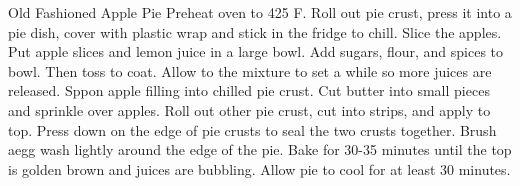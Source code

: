 \documentclass[../main.tex]{subfiles}
\begin{document}
\begin{recipe}{Old Fashioned Apple Pie}{}{}
    Preheat oven to 425 \degrees{}F.
    Roll out pie crust, press it into a pie dish, cover with plastic wrap and
    stick in the fridge to chill.
    Slice the apples.
    Put apple slices and lemon juice in a large bowl.
    Add sugars, flour, and spices to bowl. Then toss to coat. Allow to the
    mixture to set a while so more juices are released. Sppon apple filling
    into chilled pie crust.
    Cut butter into small pieces and sprinkle over apples. Roll out other pie
    crust, cut into strips, and apply to top. Press down on the edge of pie
    crusts to seal the two crusts together.
    Brush aegg wash lightly around the edge of the pie. Bake for 30-35 minutes
    until the top is golden brown and juices are bubbling. Allow pie to cool
    for at least 30 minutes.
\end{recipe}
\end{document}

